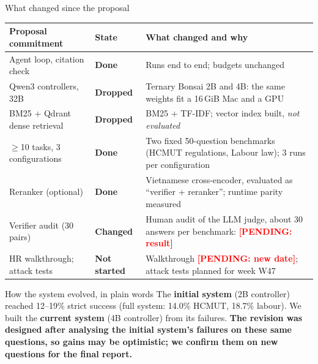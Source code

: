 \documentclass[aspectratio=1610,11pt]{beamer}
\newcommand{\pend}[1]{\textcolor{red}{\textbf{[PENDING: #1]}}}
\renewcommand{\arraystretch}{1.15}
\begin{document}
\begin{frame}{What changed since the proposal}
  \footnotesize\renewcommand{\arraystretch}{1.0}
  \begin{tabularx}{\textwidth}{@{}>{\raggedright\arraybackslash}p{3.9cm}>{\bfseries}p{1.95cm}X@{}}
    \toprule Proposal commitment & State & What changed and why\\\midrule
    Agent loop, citation check & \textcolor{successgreen}{Done} & Runs end to end; budgets unchanged\\
    Qwen3 controllers, 32B & \textcolor{dangerred}{Dropped} & Ternary Bonsai 2B and 4B: the same weights fit a 16\,GiB Mac and a GPU\\
    BM25 + Qdrant dense retrieval & \textcolor{dangerred}{Dropped} & BM25 + TF-IDF; vector index built, \emph{not evaluated}\\
    $\ge$10 tasks, 3 configurations & \textcolor{successgreen}{Done} & Two fixed 50-question benchmarks (HCMUT regulations, Labour law); 3 runs per configuration\\
    Reranker (optional) & \textcolor{successgreen}{Done} & Vietnamese cross-encoder, evaluated as ``verifier + reranker''; runtime parity measured\\
    Verifier audit (30 pairs) & \textcolor{warnorange}{Changed} & Human audit of the LLM judge, about 30 answers per benchmark: \pend{result}\\
    HR walkthrough; attack tests & \textcolor{warnorange}{Not started} & Walkthrough \pend{new date}; attack tests planned for week W47\\
    \bottomrule
  \end{tabularx}
  \vspace{2pt}

  \begin{alertblock}{How the system evolved, in plain words}
    \footnotesize The \textbf{initial system} (2B controller) reached 12--19\% strict success (full system: 14.0\% HCMUT, 18.7\% labour). We built the \textbf{current system} (4B controller) from its failures. \textbf{The revision was designed after analysing the initial system's failures on these same questions, so gains may be optimistic; we confirm them on new questions for the final report.}
  \end{alertblock}
\end{frame}
\end{document}

